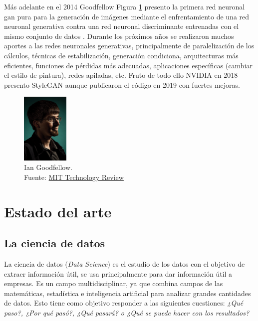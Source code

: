 Más adelante en el 2014 {Goodfellow} Figura \ref{fig:gan-ian-goodfellow} presento la primera red neuronal \acrshort{gan} pura para la generación de imágenes mediante el enfrentamiento de una red neuronal generativa contra una red neuronal discriminante entrenadas con el mismo conjunto de datos \cite{goodfellow2014generative}.
Durante los próximos años se realizaron muchos aportes a las redes neuronales generativas, principalmente de paralelización de los cálculos, técnicas de estabilización, generación condiciona, arquitecturas más eficientes, funciones de pérdidas más adecuadas, aplicaciones específicas (cambiar el estilo de pintura), redes apiladas, etc.
Fruto de todo ello {NVIDIA} en 2018 presento \gls{StyleGAN} \cite{karras2019stylebased} aunque publicaron el código en 2019 con fuertes mejoras.

\begin{figure}[H]
  \centering
  \includegraphics[width=0.2\textwidth]{figures/gan-goodfellow.png}
  \caption{Ian Goodfellow.\\Fuente: \href{https://www.technologyreview.es/s/10016/el-senor-de-las-gan-el-hombre-que-dio-imaginacion-las-maquinas}{MIT Technology Review}}
  \label{fig:gan-ian-goodfellow}
\end{figure}


\section{Estado del arte}
\label{ch:2:section:state-of-the-art}

\subsection{La ciencia de datos}
La ciencia de datos (\textit{Data Science}) es el estudio de los datos con el objetivo de extraer información útil, se usa principalmente para dar información útil a empresas. Es un campo multidisciplinar, ya que combina campos de las matemáticas, estadística e inteligencia artificial para analizar grandes cantidades de datos. Esto tiene como objetivo responder a las siguientes cuestiones: \textit{¿Qué paso?, ¿Por qué pasó?, ¿Qué pasará? o ¿Qué se puede hacer con los resultados?} \cite{aws-data-science}

